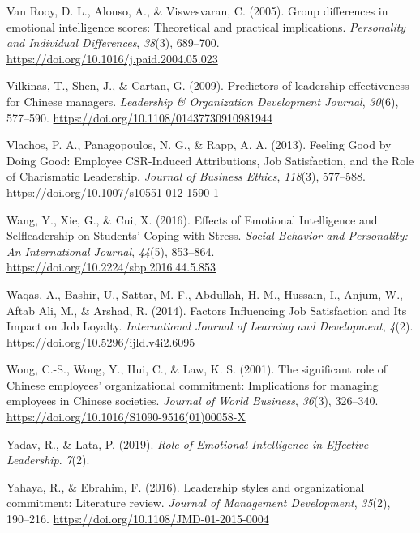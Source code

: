 \documentclass[
  man,
  longtable,
  nolmodern,
  notxfonts,
  notimes,
  colorlinks=true,linkcolor=blue,citecolor=blue,urlcolor=blue]{apa7}
\newlength{\cslhangindent}
\newenvironment{CSLReferences}[2] %
 {\begin{list}{}{%
  \setlength{\itemindent}{0pt}
  \setlength{\leftmargin}{0pt}
  \setlength{\parsep}{0pt}
  \ifodd #1
   \setlength{\leftmargin}{\cslhangindent}
   \setlength{\itemindent}{-1\cslhangindent}
  \fi
  \setlength{\itemsep}{#2\baselineskip}}}
 {\end{list}}
\begin{document}
\begin{CSLReferences}{1}{0}
Van Rooy, D. L., Alonso, A., \& Viswesvaran, C. (2005). Group
differences in emotional intelligence scores: Theoretical and practical
implications. \emph{Personality and Individual Differences},
\emph{38}(3), 689--700. \url{https://doi.org/10.1016/j.paid.2004.05.023}

Vilkinas, T., Shen, J., \& Cartan, G. (2009). Predictors of leadership
effectiveness for {Chinese} managers. \emph{Leadership \& Organization
Development Journal}, \emph{30}(6), 577--590.
\url{https://doi.org/10.1108/01437730910981944}

Vlachos, P. A., Panagopoulos, N. G., \& Rapp, A. A. (2013). Feeling
{Good} by {Doing Good}: {Employee CSR-Induced Attributions}, {Job
Satisfaction}, and the {Role} of {Charismatic Leadership}. \emph{Journal
of Business Ethics}, \emph{118}(3), 577--588.
\url{https://doi.org/10.1007/s10551-012-1590-1}

Wang, Y., Xie, G., \& Cui, X. (2016). Effects of {Emotional
Intelligence} and {Selfleadership} on {Students}' {Coping} with
{Stress}. \emph{Social Behavior and Personality: An International
Journal}, \emph{44}(5), 853--864.
\url{https://doi.org/10.2224/sbp.2016.44.5.853}

Waqas, A., Bashir, U., Sattar, M. F., Abdullah, H. M., Hussain, I.,
Anjum, W., Aftab Ali, M., \& Arshad, R. (2014). Factors {Influencing Job
Satisfaction} and {Its Impact} on {Job Loyalty}. \emph{International
Journal of Learning and Development}, \emph{4}(2).
\url{https://doi.org/10.5296/ijld.v4i2.6095}

Wong, C.-S., Wong, Y., Hui, C., \& Law, K. S. (2001). The significant
role of {Chinese} employees' organizational commitment: Implications for
managing employees in {Chinese} societies. \emph{Journal of World
Business}, \emph{36}(3), 326--340.
\url{https://doi.org/10.1016/S1090-9516(01)00058-X}

Yadav, R., \& Lata, P. (2019). \emph{Role of {Emotional Intelligence} in
{Effective Leadership}}. \emph{7}(2).

Yahaya, R., \& Ebrahim, F. (2016). Leadership styles and organizational
commitment: Literature review. \emph{Journal of Management Development},
\emph{35}(2), 190--216. \url{https://doi.org/10.1108/JMD-01-2015-0004}


\end{CSLReferences}
\end{document}
